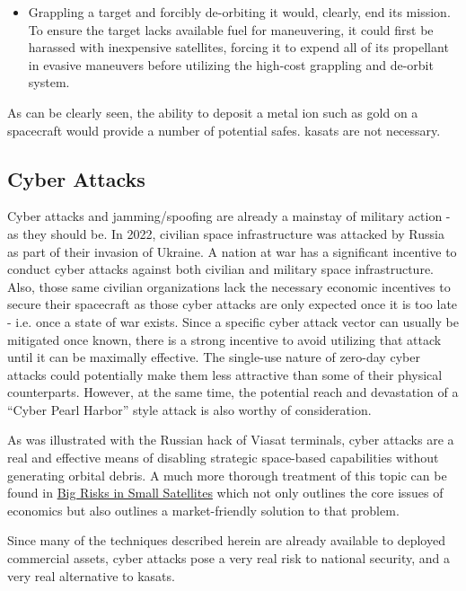 \begin{itemize}
\item Grappling a target and forcibly de-orbiting it would, clearly,
  end its mission.  To ensure the target lacks available fuel for
  maneuvering, it could first be harassed with inexpensive satellites,
  forcing it to expend all of its propellant in evasive maneuvers
  before utilizing the high-cost grappling and de-orbit system.

\end{itemize}

As can be clearly seen, the ability to deposit a metal ion such as
gold on a spacecraft would provide a number of potential \acp{safe}.
\acp{kasat} are not necessary.


\subsection{Cyber Attacks}

Cyber attacks and jamming/spoofing are already a mainstay of military
action - as they should be.  In 2022, civilian space infrastructure
was attacked by Russia as part of their invasion of Ukraine.  A nation
at war has a significant incentive to conduct cyber attacks against
both civilian and military space infrastructure.\cite{big-risks} Also,
those same civilian organizations lack the necessary economic
incentives to secure their spacecraft as those cyber attacks are only
expected once it is too late - i.e. once a state of war exists.  Since
a specific cyber attack vector can usually be mitigated once known,
there is a strong incentive to avoid utilizing that attack until it
can be maximally effective.  The single-use nature of zero-day cyber
attacks could potentially make them less attractive than some of their
physical counterparts.  However, at the same time, the potential reach
and devastation of a ``Cyber Pearl Harbor'' style attack is also
worthy of consideration.

As was illustrated with the Russian hack of Viasat terminals, cyber
attacks are a real and effective means of disabling strategic
space-based capabilities without generating orbital debris.  A much
more thorough treatment of this topic can be found in
\href{https://www.researchgate.net/publication/341435541_Big_Risks_in_Small_Satellites_-_The_Need_for_Secure_Infrastructure_as_a_Service}{Big
  Risks in Small Satellites} which not only outlines the core issues
of economics but also outlines a market-friendly solution to that
problem.

Since many of the techniques described herein are already available to
deployed commercial assets, cyber attacks pose a very real risk to
national security, and a very real alternative to \acp{kasat}.
